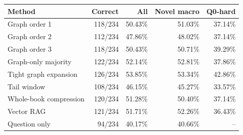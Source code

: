 \begin{tabular}{lrrrr}
\toprule
Method & Correct & All & Novel macro & Q0-hard \\
\midrule
Graph order 1 & 118/234 & 50.43\% & 51.03\% & 37.14\% \\
Graph order 2 & 112/234 & 47.86\% & 48.02\% & 37.14\% \\
Graph order 3 & 118/234 & 50.43\% & 50.71\% & 39.29\% \\
Graph-only majority & 122/234 & 52.14\% & 52.81\% & 37.86\% \\
Tight graph expansion & 126/234 & 53.85\% & 53.34\% & 42.86\% \\
Tail window & 108/234 & 46.15\% & 45.27\% & 33.57\% \\
Whole-book compression & 120/234 & 51.28\% & 50.40\% & 37.14\% \\
Vector RAG & 121/234 & 51.71\% & 52.26\% & 36.43\% \\
Question only & 94/234 & 40.17\% & 40.66\% & -- \\
\bottomrule
\end{tabular}
